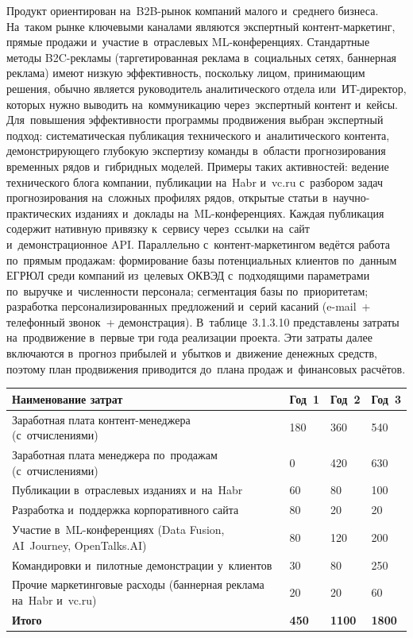 Продукт ориентирован на~B2B-рынок компаний малого и~среднего бизнеса.
На~таком рынке ключевыми каналами являются экспертный контент-маркетинг,
прямые продажи и~участие в~отраслевых ML-конференциях. Стандартные методы
B2C-рекламы (таргетированная реклама в~социальных сетях, баннерная реклама)
имеют низкую эффективность, поскольку лицом, принимающим решения, обычно
является руководитель аналитического отдела или~ИТ-директор, которых нужно
выводить на~коммуникацию через~экспертный контент и~кейсы.
Для~повышения эффективности программы продвижения выбран экспертный подход:
систематическая публикация технического и~аналитического контента,
демонстрирующего глубокую экспертизу команды в~области прогнозирования
временных рядов и~гибридных моделей. Примеры таких активностей: ведение
технического блога компании, публикации на~Habr и~vc.ru с~разбором задач
прогнозирования на~сложных профилях рядов, открытые статьи
в~научно-практических изданиях и~доклады на~ML-конференциях. Каждая публикация
содержит нативную привязку к~сервису через~ссылки на~сайт и~демонстрационное
API. Параллельно с~контент-маркетингом ведётся работа по~прямым продажам:
формирование базы потенциальных клиентов по~данным ЕГРЮЛ среди компаний
из~целевых ОКВЭД с~подходящими параметрами по~выручке и~численности персонала;
сегментация базы по~приоритетам; разработка персонализированных предложений
и~серий касаний (e-mail~+ телефонный звонок~+ демонстрация).
В~таблице~3.1.3.10 представлены затраты на~продвижение в~первые три года
реализации проекта. Эти затраты далее включаются в~прогноз прибылей и~убытков
и~движение денежных средств, поэтому план продвижения приводится до~плана
продаж и~финансовых расчётов.

{\small
\begin{longtable}{L{9.0cm} C{1.8cm} C{1.8cm} C{1.8cm}}
\toprule
Наименование затрат & Год~1 & Год~2 & Год~3 \\
\midrule
\endhead
Заработная плата контент-менеджера (с~отчислениями) & 180 & 360 & 540 \\
Заработная плата менеджера по~продажам (с~отчислениями) & 0 & 420 & 630 \\
Публикации в~отраслевых изданиях и~на~Habr & 60 & 80 & 100 \\
Разработка и~поддержка корпоративного сайта & 80 & 20 & 20 \\
Участие в~ML-конференциях (Data Fusion, AI~Journey, OpenTalks.AI) & 80 & 120 & 200 \\
Командировки и~пилотные демонстрации у~клиентов & 30 & 80 & 250 \\
Прочие маркетинговые расходы (баннерная реклама на~Habr и~vc.ru) & 20 & 20 & 60 \\
\midrule
\textbf{Итого} & \textbf{450} & \textbf{1100} & \textbf{1800} \\
\bottomrule
\end{longtable}
}

